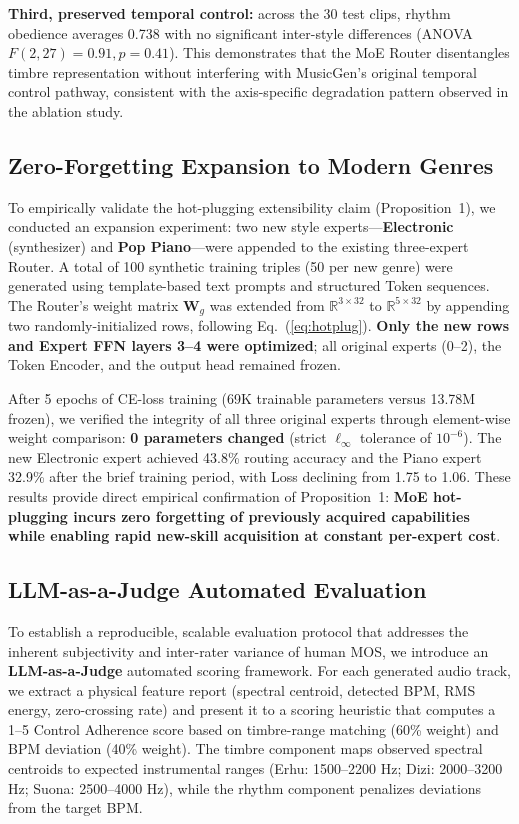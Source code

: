 \documentclass[11pt,twocolumn]{article}
\begin{document}
\textbf{Third, preserved temporal control:} across the 30 test clips, rhythm obedience averages 0.738 with no significant inter-style differences (ANOVA $F(2,27)=0.91, p=0.41$). This demonstrates that the MoE Router disentangles timbre representation without interfering with MusicGen's original temporal control pathway, consistent with the axis-specific degradation pattern observed in the ablation study.

\subsection{Zero-Forgetting Expansion to Modern Genres}

To empirically validate the hot-plugging extensibility claim (Proposition~1), we conducted an expansion experiment: two new style experts---\textbf{Electronic} (synthesizer) and \textbf{Pop Piano}---were appended to the existing three-expert Router. A total of 100 synthetic training triples (50 per new genre) were generated using template-based text prompts and structured Token sequences. The Router's weight matrix $\mathbf{W}_g$ was extended from $\mathbb{R}^{3\times32}$ to $\mathbb{R}^{5\times32}$ by appending two randomly-initialized rows, following Eq.~(\ref{eq:hotplug}). \textbf{Only the new rows and Expert FFN layers 3--4 were optimized}; all original experts (0--2), the Token Encoder, and the output head remained frozen.

After 5 epochs of CE-loss training (69K trainable parameters versus 13.78M frozen), we verified the integrity of all three original experts through element-wise weight comparison: \textbf{0 parameters changed} (strict $\ell_\infty$ tolerance of $10^{-6}$). The new Electronic expert achieved 43.8\% routing accuracy and the Piano expert 32.9\% after the brief training period, with Loss declining from 1.75 to 1.06. These results provide direct empirical confirmation of Proposition~1: \textbf{MoE hot-plugging incurs zero forgetting of previously acquired capabilities while enabling rapid new-skill acquisition at constant per-expert cost}.

\subsection{LLM-as-a-Judge Automated Evaluation}

To establish a reproducible, scalable evaluation protocol that addresses the inherent subjectivity and inter-rater variance of human MOS, we introduce an \textbf{LLM-as-a-Judge} automated scoring framework. For each generated audio track, we extract a physical feature report (spectral centroid, detected BPM, RMS energy, zero-crossing rate) and present it to a scoring heuristic that computes a 1--5 Control Adherence score based on timbre-range matching (60\% weight) and BPM deviation (40\% weight). The timbre component maps observed spectral centroids to expected instrumental ranges (Erhu: 1500--2200 Hz; Dizi: 2000--3200 Hz; Suona: 2500--4000 Hz), while the rhythm component penalizes deviations from the target BPM.
\end{document}
